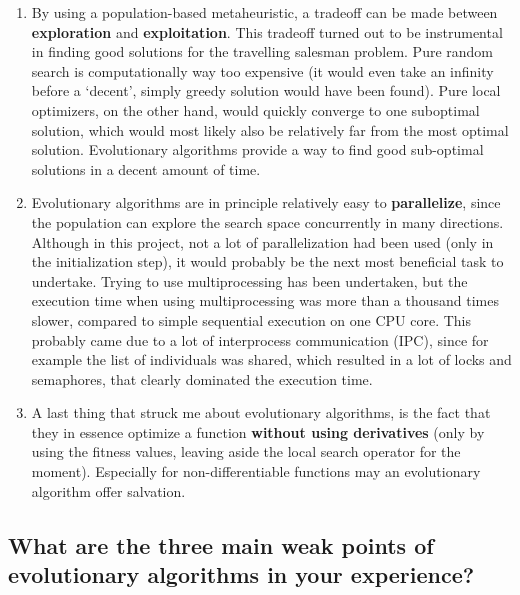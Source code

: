 \documentclass[a4paper,10pt]{article}
\begin{document}
\begin{enumerate}
 \item By using a population-based metaheuristic, a tradeoff can be made between \textbf{exploration} and \textbf{exploitation}. This tradeoff turned out to be instrumental in finding good solutions for the travelling salesman problem. Pure random search is computationally way too expensive (it would even take an infinity before a `decent', simply greedy solution would have been found). Pure local optimizers, on the other hand, would quickly converge to one suboptimal solution, which would most likely also be relatively far from the most optimal solution. Evolutionary algorithms provide a way to find good sub-optimal solutions in a decent amount of time.
 \item Evolutionary algorithms are in principle relatively easy to \textbf{parallelize}, since the population can explore the search space concurrently in many directions. Although in this project, not a lot of parallelization had been used (only in the initialization step), it would probably be the next most beneficial task to undertake. Trying to use multiprocessing has been undertaken, but the execution time when using multiprocessing was more than a thousand times slower, compared to simple sequential execution on one CPU core. This probably came due to a lot of interprocess communication (IPC), since for example the list of individuals was shared, which resulted in a lot of locks and semaphores, that clearly dominated the execution time.
 \item A last thing that struck me about evolutionary algorithms, is the fact that they in essence optimize a function \textbf{without using derivatives} (only by using the fitness values, leaving aside the local search operator for the moment). Especially for non-differentiable functions may an evolutionary algorithm offer salvation.
\end{enumerate}

\subsection{What are the three main weak points of evolutionary algorithms in your experience?}
\end{document}
